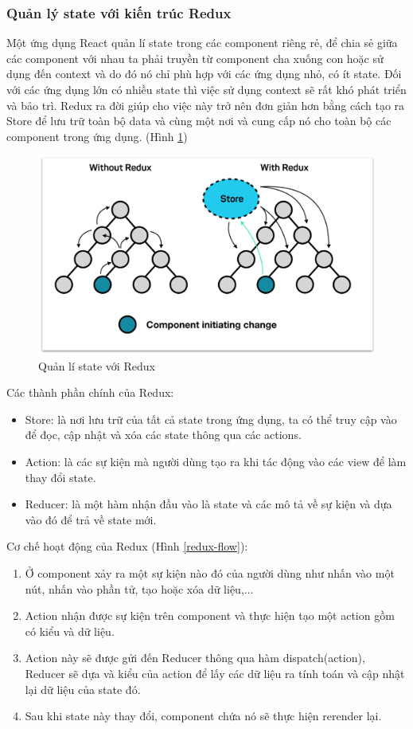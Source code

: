 \subsubsection{Quản lý state với kiến trúc Redux}

Một ứng dụng React quản lí state trong các component riêng rẻ, để chia sẻ giữa các component với nhau ta phải truyền từ component cha xuống con hoặc sử dụng đến context và do đó nó chỉ phù hợp với các ứng dụng nhỏ, có ít state. Đối với các ứng dụng lớn có nhiều state thì việc sử dụng context sẽ rất khó phát triển và bảo trì. Redux ra đời giúp cho việc này trở nên đơn giản hơn bằng cách tạo ra Store để lưu trữ toàn bộ data và cùng một nơi và cung cấp nó cho toàn bộ các component trong ứng dụng. (Hình \ref{redux})\par
\begin{figure}[H]
    \begin{center}
        \includegraphics[width=12cm]{Image/Technical/redux.png}
        \caption{Quản lí state với Redux}
        \label{redux}
    \end{center}
\end{figure}
Các thành phần chính của Redux:
\begin{itemize}
    \item Store: là nơi lưu trữ của tất cả state trong ứng dụng, ta có thể truy cập vào để đọc, cập nhật và xóa các state thông qua các actions.
    \item Action: là các sự kiện mà người dùng tạo ra khi tác động vào các view để làm thay đổi state.
    \item Reducer: là một hàm nhận đầu vào là state và các mô tả về sự kiện và dựa vào đó để trả về state mới.
\end{itemize}

Cơ chế hoạt động của Redux (Hình \ref{redux-flow}):
\begin{enumerate}
    \item Ở component xảy ra một sự kiện nào đó của người dùng như nhấn vào một nút, nhấn vào phần tử, tạo hoặc xóa dữ liệu,...
    \item Action nhận được sự kiện trên component và thực hiện tạo một action gồm có kiểu và dữ liệu.
    \item Action này sẽ được gửi đến Reducer thông qua hàm dispatch(action), Reducer sẽ dựa và kiểu của action để lấy các dữ liệu ra tính toán và cập nhật lại dữ liệu của state đó.
    \item Sau khi state này thay đổi, component chứa nó sẽ thực hiện rerender lại.
\end{enumerate}


